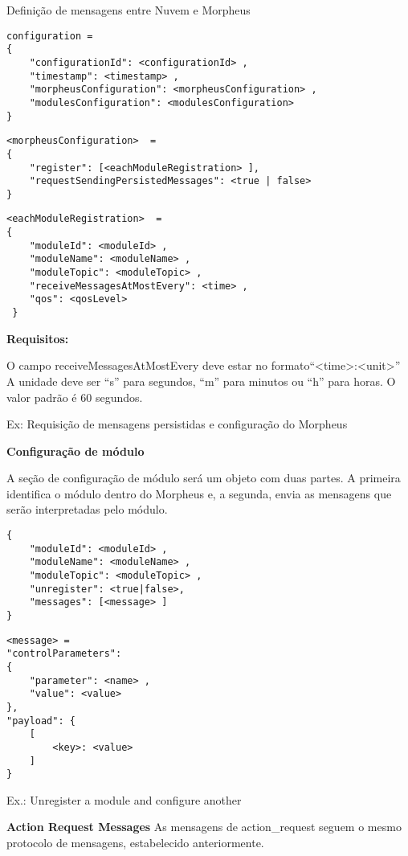 Definição de mensagens entre Nuvem e Morpheus
\begin{lstlisting}
configuration =
{
    "configurationId": <configurationId> ,
    "timestamp": <timestamp> ,
    "morpheusConfiguration": <morpheusConfiguration> ,
    "modulesConfiguration": <modulesConfiguration>
}
\end{lstlisting}

\begin{lstlisting}
<morpheusConfiguration>  =
{
    "register": [<eachModuleRegistration> ],
    "requestSendingPersistedMessages": <true | false>
}
\end{lstlisting}

\begin{lstlisting}
<eachModuleRegistration>  =
{
    "moduleId": <moduleId> ,
    "moduleName": <moduleName> ,
    "moduleTopic": <moduleTopic> ,
    "receiveMessagesAtMostEvery": <time> ,
    "qos": <qosLevel>
 }
 \end{lstlisting}


\textbf{Requisitos:}

O campo receiveMessagesAtMostEvery deve estar no formato“\textless time\textgreater :\textless unit\textgreater ”
A unidade deve ser “s” para segundos, “m” para minutos ou “h” para horas. O valor padrão é 60 segundos.

Ex: Requisição de mensagens persistidas e configuração do Morpheus

\textbf{Configuração de módulo}

A seção de configuração de módulo será um objeto com duas partes. A primeira identifica o módulo dentro do Morpheus e, a segunda, envia as mensagens que serão interpretadas pelo módulo.
\begin{lstlisting}
{
    "moduleId": <moduleId> ,
    "moduleName": <moduleName> ,
    "moduleTopic": <moduleTopic> ,
    "unregister": <true|false>,
    "messages": [<message> ]
}
\end{lstlisting}

\begin{lstlisting}
<message> =
"controlParameters":
{
    "parameter": <name> ,
    "value": <value>
},
"payload": {
    [
        <key>: <value>
    ]
}
\end{lstlisting}

Ex.: Unregister a module and configure another


\textbf{Action Request Messages}
As mensagens de action\_request seguem o mesmo protocolo de mensagens, estabelecido anteriormente.


